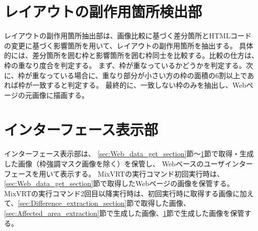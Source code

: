 

\section{レイアウトの副作用箇所検出部}\label{sec:Layout_subEffect_extraction_section}
レイアウトの副作用箇所抽出部は、画像比較に基づく差分箇所とHTMLコードの変更に基づく影響箇所を用いて、レイアウトの副作用箇所を抽出する。
具体的には、差分箇所を囲む枠と影響箇所を囲む枠同士を比較する。比較の仕方は、枠の重なり度合を判定する。
まず、枠が重なっているかどうかを判定する。次に、枠が重なっている場合に、重なり部分が小さい方の枠の面積の6割以上であれば枠が一致すると判定する。
最終的に、一致しない枠のみを抽出し、Webページの元画像に描画する。


\section{インターフェース表示部}\label{sec:Interface_Display_Section}
インターフェース表示部は、
\ref{sec:Web_data_get_section}節～\ref{sec:Layout_subEffect_extraction_section}節で取得・生成した画像（枠強調マスク画像を除く）を保管し、
Webベースのユーザインターフェースを用いて表示する。
MixVRTの実行コマンド初回実行時は、\ref{sec:Web_data_get_section}節で取得したWebページの画像を保管する。
MixVRTの実行コマンド2回目以降実行時は、初回実行時に取得する画像に加えて、\ref{sec:Difference_extraction_section}節で取得した画像、
\ref{sec:Affected_area_extraction}節で生成した画像、\ref{sec:Layout_subEffect_extraction_section}節で生成した画像を保管する。



